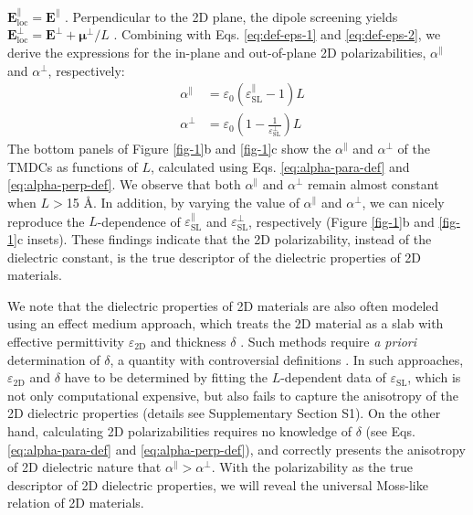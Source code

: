 \documentclass[journal=ancac3,manuscript=article,email=true,hyperref=true,keywords=false]{achemso}
\begin{document}
$\mathbf{E}^{\parallel}_{\mathrm{loc}}=\mathbf{E}^{\parallel}$
\cite{Markel_2016}. Perpendicular to the 2D plane, the dipole
screening yields
$\boldsymbol{E}_{\mathrm{loc}}^{\perp}=\boldsymbol{E}^{\perp}+\boldsymbol{\mu}^{\perp}/L$
\cite{Meyer_2001_dipole_slab,T_bik_2004}. Combining with
Eqs. \ref{eq:def-eps-1} and \ref{eq:def-eps-2}, we derive the
expressions for the in-plane and out-of-plane 2D polarizabilities,
$\alpha^{\parallel}$ and $\alpha^{\perp}$, respectively:
\begin{eqnarray}
  \label{eq:alpha-para-def}
  &\alpha^{\parallel} &= \varepsilon_{0}(\varepsilon_{\mathrm{SL}}^{\parallel} - 1)L\\
  \label{eq:alpha-perp-def}
    &\alpha^{\perp} &= \varepsilon_{0}\left(1 - {\displaystyle \frac{1}{\varepsilon_{\mathrm{SL}}^{\perp}}}\right)L
\end{eqnarray}
The bottom panels of Figure \ref{fig-1}b and \ref{fig-1}c show the
$\alpha^{\parallel}$ and $\alpha^{\perp}$ of the TMDCs as functions of
$L$, calculated using Eqs. \ref{eq:alpha-para-def} and
\ref{eq:alpha-perp-def}. We observe that both $\alpha^{\parallel}$ and
$\alpha^{\perp}$ remain almost constant when $L>$15 \AA{}. In
addition, by varying the value of $\alpha^{\parallel}$ and
$\alpha^{\perp}$, we can nicely reproduce the $L$-dependence of
$\varepsilon_{\mathrm{SL}}^{\parallel}$ and
$\varepsilon_{\mathrm{SL}}^{\perp}$, respectively (Figure \ref{fig-1}b
and \ref{fig-1}c insets). These findings indicate that the 2D
polarizability, instead of the dielectric constant, is the true
descriptor of the dielectric properties of 2D materials.

We note that the dielectric properties of 2D materials are also often
modeled using an effect medium approach, which treats the 2D material
as a slab with effective permittivity $\varepsilon_{\mathrm{2D}}$ and
thickness $\delta$
\cite{Sharma_1985,Cudazzo_2011_screening_2D,Matthes_2016,Trolle_2017_eps_subst,Laturia_2018}. Such
methods require \textit{a priori} determination of $\delta$, a
quantity with controversial definitions \cite{Mas_Ballest__2011}. In
such approaches, $\varepsilon_{\mathrm{2D}}$ and $\delta$ have to be
determined by fitting the $L$-dependent data of
$\varepsilon_{\mathrm{SL}}$, which is not only computational
expensive, but also fails to capture the anisotropy of the 2D
dielectric properties (details see Supplementary Section S1). On the
other hand, calculating 2D polarizabilities requires no knowledge of
$\delta$ (see Eqs. \ref{eq:alpha-para-def} and
\ref{eq:alpha-perp-def}), and correctly presents the anisotropy of 2D
dielectric nature that $\alpha^{\parallel} > \alpha^{\perp}$.  With
the polarizability as the true descriptor of 2D dielectric properties,
we will reveal the universal Moss-like relation of 2D materials.
\end{document}
